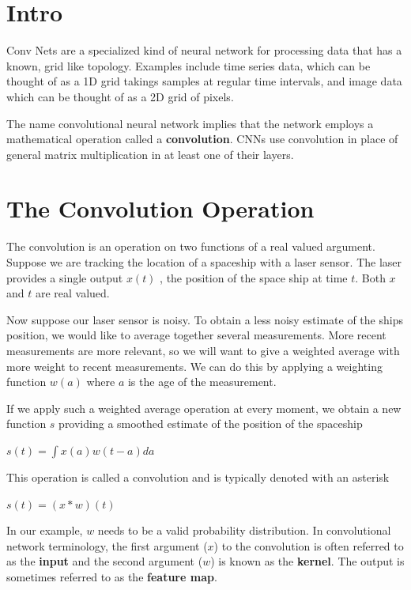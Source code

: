 \documentclass[onecolumn, letterpaper, 12pt]{report}
\begin{document}

\section{Intro}

Conv Nets are a specialized kind of neural network for processing data that has a known, grid like topology. Examples include time series data, which can be thought of as a 1D grid takings samples at regular time intervals, and image data which can be thought of as a 2D grid of pixels. 

The name convolutional neural network implies that the network employs a mathematical operation called a \textbf{convolution}. CNNs use convolution in place of general matrix multiplication in at least one of their layers. 

\section{The Convolution Operation}

The convolution is an operation on two functions of a real valued argument. Suppose we are tracking the location of a spaceship with a laser sensor. The laser provides a single output $x(t)$
, the position of the space ship at time $t$. Both $x$ and $t$ are real valued. 

Now suppose our laser sensor is noisy. To obtain a less noisy estimate of the ships position, we would like to average together several measurements. More recent measurements are more relevant, so we will want to give a weighted average with more weight to recent measurements. We can do this by applying a weighting function $w(a)$ where $a$ is the age of the measurement. 

If we apply such a weighted average operation at every moment, we obtain a new function $s$ providing a smoothed estimate of the position of the spaceship 

\begin{center}
  $s(t) = \int x(a) w(t - a) da$
\end{center}

This operation is called a convolution and is typically denoted with an asterisk

\begin{center}
  $s(t) = (x * w)(t) $
\end{center}


In our example, $w$ needs to be a valid probability distribution. In convolutional network terminology, the first argument ($x$) to the convolution is often referred to as the \textbf{input} and the second argument ($w$) is known as the \textbf{kernel}. The output is sometimes referred to as the \textbf{feature map}.
\end{document}
